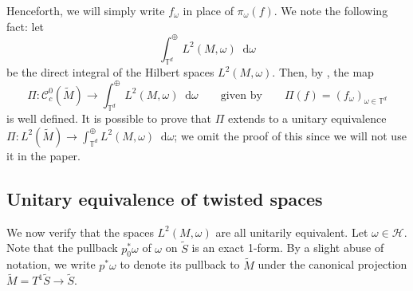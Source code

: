 \documentclass[11pt,letterpaper]{amsart}
\newcommand \cF {{\mathcal F}}
\newcommand \cH {{\mathcal H}}
\newcommand \Z {{ \mathbb Z}}
\newcommand \T {{ \mathbb T}}
\newcommand \tS {{\widetilde S}}
\newcommand \tM {{\widetilde M}}
\newcommand*{\diff}{\mathop{}\!\mathrm{d}}
\DeclareMathOperator{\vol}{vol}
\DeclareMathOperator{\Deck}{Deck}
\newtheorem {lemma}[theorem]{Lemma}
\theoremstyle{definition}
\begin{document}
Henceforth, we will simply write $f_\omega$ in place of $\pi_\omega(f)$. 
We note the following fact: let 
\[
\int^{\oplus}_{\T^d} L^2(M, \omega) \diff \omega
\]
be the direct integral of the Hilbert spaces $L^2(M, \omega)$. Then, by , the map 
\[
\Pi \colon \mathscr{C}^0_c(\tM) \to \int^{\oplus}_{\T^d}L^2(M, \omega) \diff \omega \qquad \text{given by} \qquad \Pi(f) = ( f_\omega )_{\omega \in \T^d}
\]
is well defined. It is possible to prove that $\Pi$ extends to a unitary equivalence $\Pi\colon L^2(\tM) \to \int^{\oplus}_{\T^d} L^2(M, \omega) \diff \omega$; we omit the proof of this since we will not use it in the paper.


\subsection{Unitary equivalence of twisted spaces}\label{sec:xi_and_x0}

We now verify that the spaces $L^2(M, \omega)$ are all unitarily equivalent.
Let $\omega \in \cH$. Note that the pullback $p_0^{\ast}\omega$ of $\omega$ on $\tS$ is an exact 1-form.
By a slight abuse of notation, we write $p^{\ast}\omega$ to denote its pullback to $\tM$ under the canonical projection $\tM = T^1\tS \to \tS$.
\end{document}
